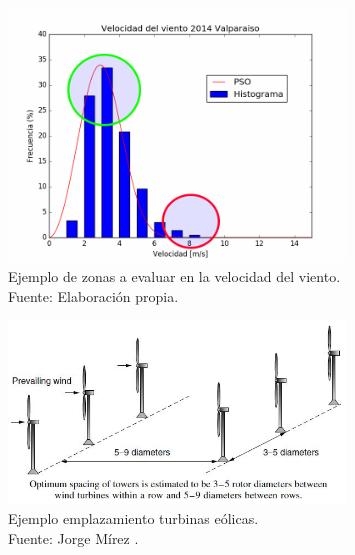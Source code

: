\begin{figure}[ht!]
    \centering
    \captionsetup{justification=centering,margin=2cm}
        \includegraphics[width=0.8\textwidth]{figures/result_2014_ejemplo_potencial.png}  
    \caption{Ejemplo de zonas a evaluar en la velocidad del viento.\\ Fuente: Elaboración propia.}
    \label{fig:ejemplo_potencial}
\end{figure}

\begin{figure}[ht!]
    \centering
    \captionsetup{justification=centering,margin=2cm}
        \includegraphics[width=0.8\textwidth]{figures/ejemplo_emplazamiento.jpg}  
    \caption{Ejemplo emplazamiento turbinas eólicas.\\ Fuente: Jorge Mírez \cite{figureEmplacement}.}
    \label{fig:ejemplo_emplazamiento}
\end{figure}
